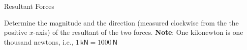 \documentclass[9pt, xcolor={svgnames, x11names},professionalfonts]{beamer}
\def\scale{1}
\begin{document}

\begin{frame}{Resultant Forces}
	
	\begin{myexam}{}{}

		Determine the magnitude and the direction (measured clockwise from the the positive $x$-axis) of the resultant of the two forces. \parm\centering
		{\bf Note}: One kilonewton is one thousand newtons, i.e., $1\,\mathsf{kN} = 1000\,\mathsf{N}$
		\parb

		\begin{center}
			\def\scale{0.9}
			

		\end{center}
	\end{myexam}

\end{frame}


			
	
	


\end{document}
